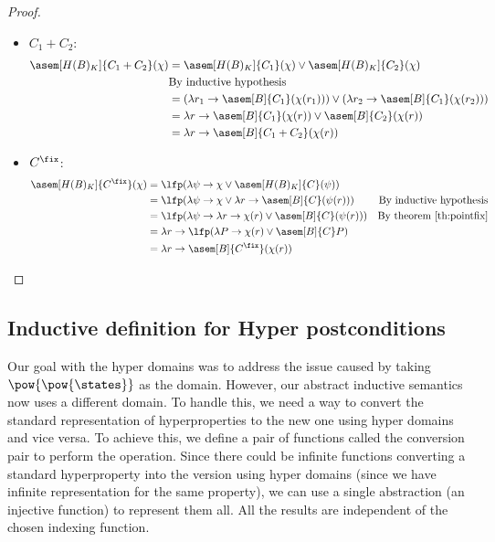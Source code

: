 \begin{proof}
\begin{itemize}
    \item $C_1 + C_2$:
      \begin{align*}
        \asem[H(B)_K]{C_1 + C_2}(\chi)
          &= \asem[H(B)_K]{C_1}(\chi) 
            \lor \asem[H(B)_K]{C_2}(\chi) \\
          &\text{By inductive hypothesis} \\
          &= (\lambda r_1 \to \asem[B]{C_1}(\chi(r_1)))
            \lor (\lambda r_2 \to \asem[B]{C_1}(\chi(r_2))) \\
          &= \lambda r \to \asem[B]{C_1}(\chi(r))
            \lor \asem[B]{C_2}(\chi(r)) \\
          &= \lambda r \to \asem[B]{C_1 + C_2}(\chi(r))
      \end{align*}

    \item $C^\fix$:
      \begin{align*}
        \asem[H(B)_K]{C^\fix}(\chi)
          &= \lfp(\lambda \psi \to 
            \chi \lor \asem[H(B)_K]{C}(\psi)) \\
          &= \lfp(\lambda \psi \to 
            \chi \lor \lambda r \to \asem[B]{C}(\psi(r)))
          &\text{By inductive hypothesis} \\
          &= \lfp(\lambda \psi \to \lambda r \to
            \chi(r) \lor \asem[B]{C}(\psi(r)))
          &\text{By theorem \ref{th:pointfix}} \\
          &= \lambda r \to \lfp(\lambda P 
            \to \chi(r) \lor \asem[B]{C} P) \\
          &= \lambda r \to \asem[B]{C^\fix}(\chi(r))
      \end{align*}
  \end{itemize}
\end{proof}


\subsection{Inductive definition for Hyper postconditions}

Our goal with the hyper domains was to address the issue caused by taking 
$\pow{\pow{\states}}$ as the domain. However, our abstract inductive semantics 
now uses a different domain. To handle this, we need a way to convert the 
standard representation of hyperproperties to the new one using hyper domains 
and vice versa. To achieve this, we define a pair of functions called the 
conversion pair to perform the operation. Since there could be infinite 
functions converting a standard hyperproperty into the version using hyper 
domains (since we have infinite representation for the same property), we can 
use a single abstraction (an injective function) to represent them all. 
All the results are independent of the chosen indexing function.

